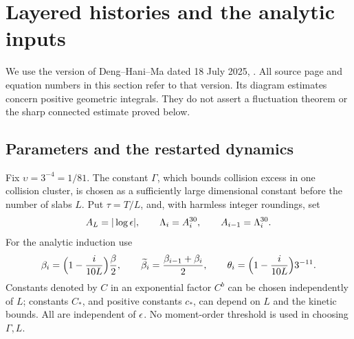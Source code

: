\section{Layered histories and the analytic inputs}\label{sec:dhm-inputs}

We use the version of Deng--Hani--Ma dated 18 July 2025,
\cite{DHM2025}. All source page and equation numbers in this section
refer to that version. Its diagram estimates concern positive geometric
integrals. They do not assert a fluctuation theorem or the sharp
connected estimate proved below.

\subsection{Parameters and the restarted dynamics}

Fix \(\upsilon=3^{-4}=1/81\). The constant \(\Gamma\), which bounds
collision excess in one collision cluster, is chosen as a sufficiently
large dimensional constant before the number of slabs \(L\).
Put \(\tau=T/L\), and, with harmless integer roundings, set
\begin{equation}\label{eq:dhm-cutoffs}
 A_L=|\log\epsilon|,\qquad
 \Lambda_i=A_i^{30},\qquad A_{i-1}=\Lambda_i^{30}.
\end{equation}
For the analytic induction use
\begin{equation}\label{eq:dhm-exponents}
 \beta_i=\Bigl(1-\frac{i}{10L}\Bigr)\frac\beta2,
 \qquad \widetilde\beta_i=\frac{\beta_{i-1}+\beta_i}{2},
 \qquad
 \theta_i=\Bigl(1-\frac{i}{10L}\Bigr)3^{-11}.
\end{equation}
Constants denoted by \(C\) in an exponential factor \(C^b\) can be
chosen independently of \(L\); constants \(C_*\), and positive constants
\(c_*\), can depend on \(L\) and the kinetic bounds. All are independent
of \(\epsilon\). No moment-order threshold is used in choosing
\(\Gamma,L\).

